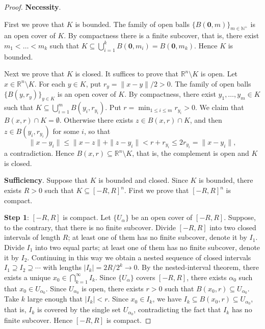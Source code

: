 \begin{proof}
\textbf{Necessity}.

First we prove that $K$ is bounded. The family of open balls $\{B(\mathbf{0}, m)\}_{m \in \mathbb{N}^+}$ is an open cover of $K$. By compactness there is a finite subcover, that is, there exist $m_1 < \dots < m_k$ such that $K \subseteq \bigcup_{i=1}^{k} B(\mathbf{0}, m_i) = B(\mathbf{0}, m_k)$. Hence $K$ is bounded.

Next we prove that $K$ is closed. It suffices to prove that $\mathbb{R}^n \setminus K$ is open. Let $x \in \mathbb{R}^n \setminus K$. For each $y \in K$, put $r_y = \|x - y\| / 2 > 0$. The family of open balls $\{B(y, r_y)\}_{y \in K}$ is an open cover of $K$. By compactness, there exist $y_1, \dots, y_m \in K$ such that $K \subseteq \bigcup_{i=1}^{m} B(y_i, r_{y_i})$. Put $r = \min_{1 \le i \le m} r_{y_i} > 0$. We claim that $B(x, r) \cap K = \emptyset$. Otherwise there exists $z \in B(x, r) \cap K$, and then $z \in B(y_i, r_{y_i})$ for some $i$, so that
\[
\|x - y_i\| \le \|x - z\| + \|z - y_i\| < r + r_{y_i} \le 2 r_{y_i} = \|x - y_i\|,
\]
a contradiction. Hence $B(x, r) \subseteq \mathbb{R}^n \setminus K$, that is, the complement is open and $K$ is closed.

\textbf{Sufficiency}. Suppose that $K$ is bounded and closed. Since $K$ is bounded, there exists $R > 0$ such that $K \subseteq [-R, R]^n$. First we prove that $[-R, R]^n$ is compact.

\textbf{Step 1}: $[-R, R]$ is compact. Let $\{U_\alpha\}$ be an open cover of $[-R, R]$. Suppose, to the contrary, that there is no finite subcover. Divide $[-R, R]$ into two closed intervals of length $R$; at least one of them has no finite subcover, denote it by $I_1$. Divide $I_1$ into two equal parts; at least one of them has no finite subcover, denote it by $I_2$. Continuing in this way we obtain a nested sequence of closed intervals $I_1 \supseteq I_2 \supseteq \cdots$ with lengths $|I_k| = 2R / 2^k \to 0$. By the nested-interval theorem, there exists a unique $x_0 \in \bigcap_{k=1}^{\infty} I_k$. Since $\{U_\alpha\}$ covers $[-R, R]$, there exists $\alpha_0$ such that $x_0 \in U_{\alpha_0}$. Since $U_{\alpha_0}$ is open, there exists $r > 0$ such that $B(x_0, r) \subseteq U_{\alpha_0}$. Take $k$ large enough that $|I_k| < r$. Since $x_0 \in I_k$, we have $I_k \subseteq B(x_0, r) \subseteq U_{\alpha_0}$, that is, $I_k$ is covered by the single set $U_{\alpha_0}$, contradicting the fact that $I_k$ has no finite subcover. Hence $[-R, R]$ is compact.


\end{proof}
